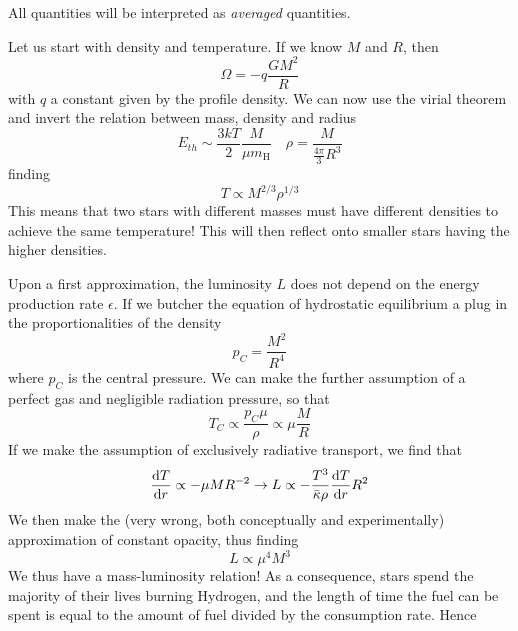 All quantities will be interpreted as \emph{averaged} quantities.
\par Let us start with density and temperature. If we know $M$ and $R$, then
\begin{equation*}
	\Omega = -q\frac{GM^{2}}{R}
\end{equation*}
with $q$ a constant given by the profile density. We can now use the virial theorem and invert the relation between mass, density and radius
\begin{equation*}
	E_{th} \sim \frac{3kT}{2}\frac{M}{\mu m_{\text{H}}} \quad \rho = \frac{M}{\frac{4\pi}{3}R^{3}}
\end{equation*}
finding 
\begin{equation}
	\boxed{
		T \propto M^{2/3}\rho^{1/3}
	}
	\label{eq:temperature_density}
\end{equation}
This means that two stars with different masses must have different densities to achieve the same temperature! This will then reflect onto smaller stars having the higher densities.
\par Upon a first approximation, the luminosity $L$ does not depend on the energy production rate $\epsilon$. If we butcher the equation of hydrostatic equilibrium a plug in the proportionalities of the density
\begin{equation*}
	p_{C} = \frac{M^{2}}{R^{4}}
\end{equation*}
where $p_{C}$ is the central pressure. We can make the further assumption of a perfect gas and negligible radiation pressure, so that
\begin{equation}
	\boxed{
	T_{C} \propto \frac{p_{C}\mu}{\rho} \propto \mu \frac{M}{R}
	}
	\label{eq:temperature_massradius}
\end{equation}
If we make the assumption of exclusively radiative transport, we find that 
\begin{equation*}
	\frac{\text{d}T}{\text{d}r} \propto -\mu M R^{-2} \to L \propto -\frac{T^{3}}{\bar{\kappa}\rho}\frac{\text{d}T}{\text{d}r}R^{2}
\end{equation*}
We then make the (very wrong, both conceptually and experimentally) approximation of constant opacity, thus finding
\begin{equation}
	\boxed{
		L \propto \mu^{4}M^{3}
	}
	\label{eq:luminosity_mass}
\end{equation}
We thus have a mass-luminosity relation! As a consequence, stars spend the majority of their lives burning Hydrogen, and the length of time the fuel can be spent is equal to the amount of fuel divided by the consumption rate. Hence 
